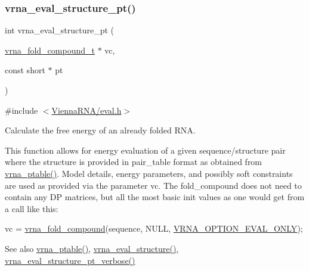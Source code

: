 \subsubsection{\texorpdfstring{vrna\+\_\+eval\+\_\+structure\+\_\+pt()}{vrna\_eval\_structure\_pt()}}
{\footnotesize\ttfamily int vrna\+\_\+eval\+\_\+structure\+\_\+pt (\begin{DoxyParamCaption}\item[{\hyperlink{group__fold__compound_ga1b0cef17fd40466cef5968eaeeff6166}{vrna\+\_\+fold\+\_\+compound\+\_\+t} $\ast$}]{vc,  }\item[{const short $\ast$}]{pt }\end{DoxyParamCaption})}



{\ttfamily \#include $<$\hyperlink{eval_8h}{Vienna\+R\+N\+A/eval.\+h}$>$}



Calculate the free energy of an already folded R\+NA. 

This function allows for energy evaluation of a given sequence/structure pair where the structure is provided in pair\+\_\+table format as obtained from \hyperlink{group__struct__utils_gae829fb8bb7f694c12a9c0bbc34c77c60}{vrna\+\_\+ptable()}. Model details, energy parameters, and possibly soft constraints are used as provided via the parameter \textquotesingle{}vc\textquotesingle{}. The fold\+\_\+compound does not need to contain any DP matrices, but all the most basic init values as one would get from a call like this\+: 
\begin{DoxyCode}
vc = \hyperlink{group__fold__compound_ga6601d994ba32b11511b36f68b08403be}{vrna\_fold\_compound}(sequence, NULL, \hyperlink{group__fold__compound_ga61469c423131552c8483229f8b6c7e0e}{VRNA\_OPTION\_EVAL\_ONLY});
\end{DoxyCode}


\begin{DoxySeeAlso}{See also}
\hyperlink{group__struct__utils_gae829fb8bb7f694c12a9c0bbc34c77c60}{vrna\+\_\+ptable()}, \hyperlink{group__eval_ga58f199f1438d794a265f3b27fc8ea631}{vrna\+\_\+eval\+\_\+structure()}, \hyperlink{group__eval_ga8a517cfeeae8c376ae7b1e0c401d38b4}{vrna\+\_\+eval\+\_\+structure\+\_\+pt\+\_\+verbose()}
\end{DoxySeeAlso}

